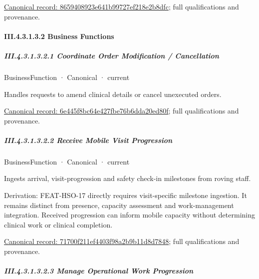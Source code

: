 {\footnotesize \href{../../../../../../../../continuum/business/business-service/8659408923e641b99727ef218e2b8dfc.md}{Canonical record: 8659408923e641b99727ef218e2b8dfc}; full qualifications and provenance.}\par
\paragraph*{III.4.3.1.3.2 Business Functions}
\label{navigation:III.4.3.1.3.2}

\subparagraph*{III.4.3.1.3.2.1 Coordinate Order Modification / Cancellation}
\label{navigation:III.4.3.1.3.2.1}

\label{element:6e445f8bc64e427fbe76b6dda20ed80f}
{\small BusinessFunction · Canonical · current}\par

Handles requests to amend clinical details or cancel unexecuted orders.


{\footnotesize \href{../../../../../../../../continuum/business/business-function/6e445f8bc64e427fbe76b6dda20ed80f.md}{Canonical record: 6e445f8bc64e427fbe76b6dda20ed80f}; full qualifications and provenance.}\par
\subparagraph*{III.4.3.1.3.2.2 Receive Mobile Visit Progression}
\label{navigation:III.4.3.1.3.2.2}

\label{element:71700f211ef4403f98a2b9b11d8d7848}
{\small BusinessFunction · Canonical · current}\par

Ingests arrival, visit-progression and safety check-in milestones from roving staff.



Derivation: FEAT-HSO-17 directly requires visit-specific milestone ingestion. It remains distinct from presence, capacity assessment and work-management integration. Received progression can inform mobile capacity without determining clinical work or clinical completion.


{\footnotesize \href{../../../../../../../../continuum/business/business-function/71700f211ef4403f98a2b9b11d8d7848.md}{Canonical record: 71700f211ef4403f98a2b9b11d8d7848}; full qualifications and provenance.}\par
\subparagraph*{III.4.3.1.3.2.3 Manage Operational Work Progression}
\label{navigation:III.4.3.1.3.2.3}

